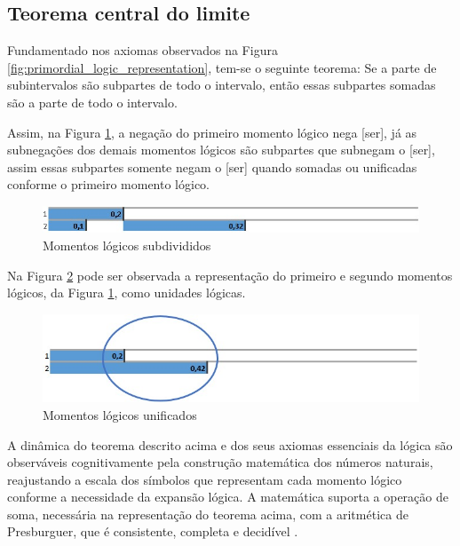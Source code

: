 \subsection{Teorema central do limite}
Fundamentado nos axiomas observados na Figura \ref{fig:primordial_logic_representation}, tem-se o seguinte teorema: Se a parte de subintervalos são subpartes de todo o intervalo, então essas subpartes somadas são a parte de todo o intervalo.

Assim, na Figura \ref{fig:second_logical_moment}, a negação do primeiro momento lógico nega [ser], já as subnegações dos demais momentos lógicos são subpartes que subnegam o [ser], assim essas subpartes somente negam o [ser] quando somadas ou unificadas conforme o primeiro momento lógico.
	\begin{figure}[H]
	\caption{Momentos lógicos subdivididos}
	\label{fig:second_logical_moment}
	\centering
	\includegraphics[scale=.8]{sections/images/second_logical_moment.jpg}
	\end{figure}

Na Figura \ref{fig:logical_units} pode ser observada a representação do primeiro e segundo momentos lógicos, da Figura \ref{fig:second_logical_moment}, como unidades lógicas.
	\begin{figure}[H]
	\caption{Momentos lógicos unificados}
	\label{fig:logical_units}
	\centering
	\includegraphics[scale=.8]{sections/images/logical_units.jpg}
	\end{figure}

A dinâmica do teorema descrito acima e dos seus axiomas essenciais da lógica são observáveis cognitivamente pela construção matemática dos números naturais, reajustando a escala dos símbolos que representam cada momento lógico conforme a necessidade da expansão lógica. A matemática suporta a operação de soma, necessária na representação do teorema acima, com a aritmética de Presburguer, que é consistente, completa e decidível \cite{wiki_AritmeticaPresburger}.

